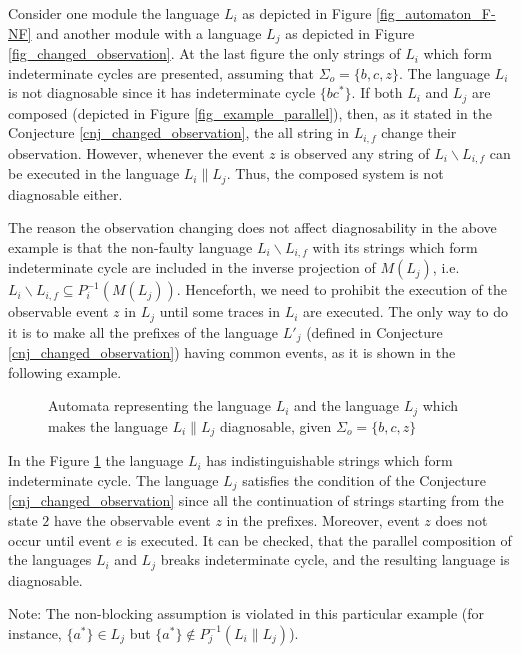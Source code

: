 \documentclass[a4paper,oneside]{article}
\begin{document}
\begin{example} Consider one module the language $L_i$ as depicted in
Figure \ref{fig_automaton_F-NF} and another module with a language $L_j$ as
depicted in Figure \ref{fig_changed_observation}. At the last figure the
only strings of $L_i$ which form indeterminate cycles are presented, assuming that 
$\Sigma_o = \{b, c, z\}$. The language $L_i$ is not diagnosable since it has
indeterminate cycle $\{bc^*\}$. If both $L_i$ and $L_j$ are composed
(depicted in Figure \ref{fig_example_parallel}), then, as it
stated in the Conjecture \ref{cnj_changed_observation}, the all string in
$L_{i,f}$ change their observation.
However, whenever the event $z$ is observed any string of $L_i\backslash
L_{i,f}$ can be executed in the language $L_i \parallel L_j$.
Thus, the composed system is not diagnosable either.
\end{example}

The reason the observation changing does not affect diagnosability in the
above example is that the non-faulty language $L_i\backslash L_{i,f}$ with its 
strings which form indeterminate cycle are included in the inverse projection of
$M(L_j)$, i.e.
$
L_i\backslash L_{i,f} \subseteq P_i^{-1}(M(L_j)).
$
Henceforth, we need to prohibit the execution of the observable event $z$
in $L_j$ until some traces in $L_i$ are executed. The only way to do it is to
make all the prefixes of the language $L'_j$ (defined in Conjecture
\ref{cnj_changed_observation}) having common events, as it is shown in the
following example.

\begin{figure}[t]
\centering

\caption{Automata representing the language $L_i$ and the language $L_j$ which
makes the language $L_i \parallel L_j$ diagnosable, given 
$\Sigma_o = \{b, c, z\}$}
\label{fig_changed_observation2}
\end{figure}

\begin{example} In the Figure \ref{fig_changed_observation2} the language $L_i$
has indistinguishable strings which form indeterminate cycle. The language
$L_j$ satisfies the condition of the Conjecture \ref{cnj_changed_observation}
since all the continuation of strings starting from the state $2$ have the
observable event $z$ in the prefixes. Moreover, event $z$ does not occur until 
event $e$ is executed. It can be checked, that the parallel composition of the
languages $L_i$ and $L_j$ breaks indeterminate cycle, and the resulting
language is diagnosable.

Note: The non-blocking assumption is violated in this particular example (for
instance, 
$\{a^*\} \in L_j$ but $\{a^*\} \not \in P^{-1}_j(L_i \parallel L_j)$).
\end{example}
\end{document}
